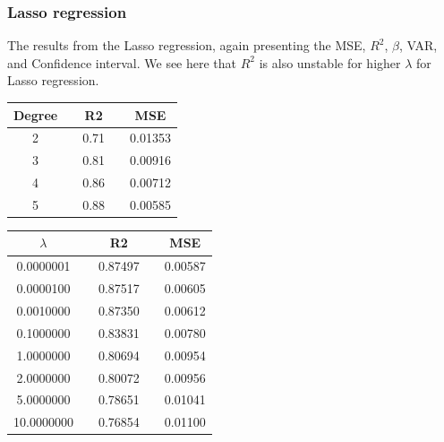  

\subsubsection{Lasso regression}
The results from the Lasso regression, again presenting the MSE, $R^2$, $\beta$, VAR, and Confidence interval. We see here that $R^2$ is also unstable for higher $\lambda$  for Lasso regression. 


 \begin{center}
 \label{tab:Lasso_Degree_R2_MSE}
 \begin{tabularx}{\textwidth}{c X c X c  }
     \hline
     \hline
         Degree && R2 && MSE \\
         \hline
2      && 0.71 && 0.01353 \\ 
3      && 0.81 && 0.00916 \\ 
4      && 0.86 && 0.00712 \\ 
5      && 0.88 && 0.00585 \\ \hline
 \end{tabularx}
 \end{center}
 
 \pagebreak
 
 \begin{center}
 \label{tab:Degree_R2_MSE}
 \begin{tabularx}{\textwidth}{c X c X c  }
     \hline
     \hline
$\lambda$    &&R2     &&MSE     \\
         \hline
0.0000001 && 0.87497 &&0.00587 \\
0.0000100 && 0.87517 &&0.00605 \\
0.0010000 && 0.87350 &&0.00612 \\
0.1000000 && 0.83831 &&0.00780 \\
1.0000000 && 0.80694 &&0.00954 \\  
2.0000000 && 0.80072 &&0.00956 \\
5.0000000 && 0.78651 &&0.01041 \\
10.0000000 && 0.76854 &&0.01100
 \end{tabularx}
 \end{center}
 
